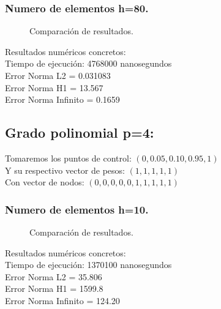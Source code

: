 \documentclass[12pt]{article}
\begin{document}
\subsubsection{Numero de elementos h=80.}
\begin{figure}[H]
    \centering
    \begin{subfigure}{0.32\textwidth}
        
    \end{subfigure}
    \hfill
    \begin{subfigure}{0.32\textwidth}
        
    \end{subfigure}
    \hfill
    \begin{subfigure}{0.32\textwidth}
        
    \end{subfigure}
    \caption{Comparación de resultados.}
    \label{fig:tresgraficas}
\end{figure}
Resultados numéricos concretos:\\
Tiempo de ejecución: 4768000 nanosegundos\\
Error Norma L2 = 0.031083\\
Error Norma H1 = 13.567\\
Error Norma Infinito = 0.1659\\
\subsection{Grado polinomial p=4:}
Tomaremos los puntos de control: ${(0, 0.05, 0.10, 0.95, 1)}$\\
Y su respectivo vector de pesos: $ (1,1,1,1,1 )$\\
Con vector de nodos: ${(0,0,0,0,0,1,1,1,1,1)}$\\
\subsubsection{Numero de elementos h=10.}
\begin{figure}[H]
    \centering
    \begin{subfigure}{0.32\textwidth}
        
    \end{subfigure}
    \hfill
    \begin{subfigure}{0.32\textwidth}
        
    \end{subfigure}
    \hfill
    \begin{subfigure}{0.32\textwidth}
        
    \end{subfigure}
    \caption{Comparación de resultados.}
    \label{fig:tresgraficas}
\end{figure}
Resultados numéricos concretos:\\
Tiempo de ejecución: 1370100 nanosegundos\\
Error Norma L2 = 35.806\\
Error Norma H1 = 1599.8\\
Error Norma Infinito = 124.20\\
\end{document}
